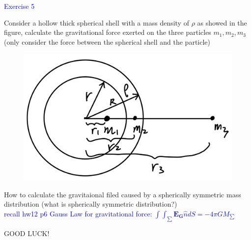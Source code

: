 \documentclass{beamer}
\begin{document}
\begin{frame}
\textcolor{blue}{Exercise 5}

Consider a hollow thick spherical shell with a mass density of $\rho$ as showed in the figure, calculate the gravitational force exerted on the three particles $m_1, m_2, m_3$ (only consider the force between the spherical shell and the particle)
\begin{figure}[htbp]
\centering
\includegraphics[width=0.4 \linewidth, angle =0]{sph.png}
\label{fig:sph}
\end{figure}
How to calculate the gravitaional filed caused by a spherically symmetric mass distribution (what is spherically symmetric distribution?)\\
\textcolor{blue}{recall hw12 p6 Gauss Law for gravitational force: $\int\int_{\sum}\mathbf{E_G}\hat{n}dS = -4\pi GM_{\sum}$}

\end{frame}
\begin{frame}
  \begin{center}
  \LARGE{GOOD LUCK!}
  \end{center}
\end{frame}
\end{document}

